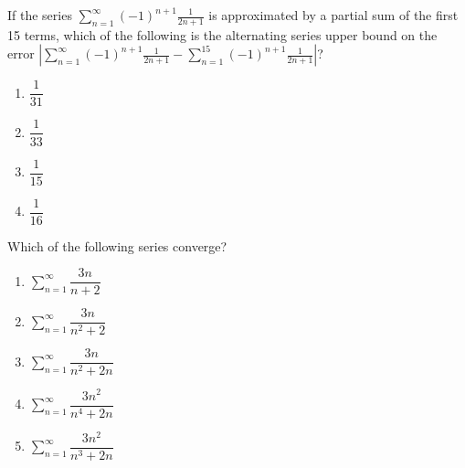 \documentclass[
]{article}
\begin{document}
\begin{enumerate}
\begin{minipage}{\linewidth}
\end{minipage}

\begin{minipage}{\linewidth}
\item
  If the series
  \(\displaystyle \sum_{n=1}^\infty (-1)^{n+1} \frac{1}{2n+1}\) is
  approximated by a partial sum of the first 15 terms, which of the
  following is the alternating series upper bound on the error
  \(\left | \displaystyle \sum_{n=1}^\infty (-1)^{n+1} \frac{1}{2n+1} - \displaystyle \sum_{n=1}^{15} (-1)^{n+1} \frac{1}{2n+1}\right |\)?

	\vspace{2ex}
  \begin{enumerate}
		\setlength{\itemsep}{2ex}		\def\labelenumi{\Alph{enumi}.}
   \item
    \(\dfrac{1}{31}\)
  \item
    \(\dfrac{1}{33}\)
		\item
    \(\dfrac{1}{15}\)
  \item
    \(\dfrac{1}{16}\)

  \end{enumerate}

	\vspace{0.25in}
	\end{minipage}

\begin{minipage}{\linewidth}
\item
  Which of the following series converge?

	\vspace{2ex}
  \begin{enumerate}
		\setlength{\itemsep}{2ex}		\def\labelenumi{\Alph{enumi}.}
    \item
    \(\displaystyle \sum_{n=1}^\infty \dfrac{3n}{n+2}\)
  \item
    \(\displaystyle \sum_{n=1}^\infty \dfrac{3n}{n^2+2}\)
  \item
    \(\displaystyle \sum_{n=1}^\infty \dfrac{3n}{n^2+2n}\)
  \item
    \(\displaystyle \sum_{n=1}^\infty \dfrac{3n^2}{n^4+2n}\)
  \item
    \(\displaystyle \sum_{n=1}^\infty \dfrac{3n^2}{n^3+2n}\)
  \end{enumerate}
	\vspace{0.25in}

\end{minipage}


\end{enumerate}
\end{document}
